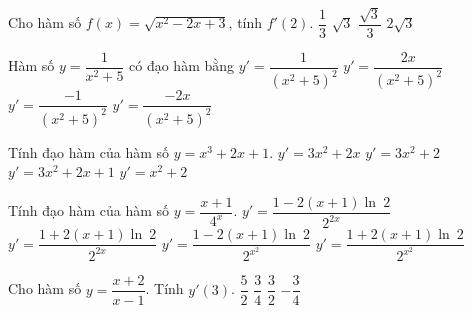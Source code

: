 \begin{ex}%
	Cho hàm số $f(x)=\sqrt{x^2-2x+3}$, tính $f'(2)$. 
	\choice 
		 {$\dfrac{1}{3}$}
		{$\sqrt{3}$} 
		 {\True $\dfrac{\sqrt{3}}{3}$}
		 {$2\sqrt{3}$}
\end{ex}

\begin{ex}%
	Hàm số $y=\dfrac{1}{x^2+5}$  có đạo hàm bằng
	\choice 
		 {$y'=\dfrac{1}{\left(x^2+5\right)^2}$}
		{$y'=\dfrac{2x}{\left(x^2+5\right)^2}$} 
		 {$y'=\dfrac{-1}{\left(x^2+5\right)^2}$}
		{\True $y'=\dfrac{-2x}{\left(x^2+5\right)^2}$} 
\end{ex}

\begin{ex}%
	Tính đạo hàm của  hàm số $ y=x^3+2x+1$.
	 \choice
		{$y'=3x^2+2x$} 
		 {\True $y'=3x^2+2$}
		 {$y'=3x^2+2x+1$}
		 {$y'=x^2+2$}
\end{ex}

\begin{ex}%
	 Tính đạo hàm của hàm số $y=\dfrac{x+1}{4^{x}}$.
	\choice 
		{\True $y'=\dfrac{1-2(x+1)\ln~2}{2^{2x}}$} 
		 {$y'=\dfrac{1+2(x+1)\ln~2}{2^{2x}}$}
		 {$y'=\dfrac{1-2(x+1)\ln~2}{2^{x^{2}}}$}
		{$y'=\dfrac{1+2(x+1)\ln~2}{2^{x^{2}}}$} 
\end{ex}

\begin{ex}%
	Cho hàm  số $y=\dfrac{x+2}{x-1}$. Tính $y'(3)$.
	 \choice
		{$\dfrac{5}{2}$} 
		 {$\dfrac{3}{4}$}
		{$\dfrac{3}{2}$} 
		{\True  $-\dfrac{3}{4}$}
\end{ex}

